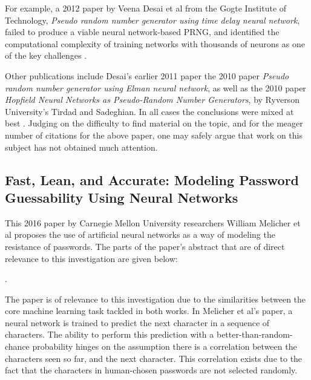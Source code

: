 \documentclass[12pt, titlepage]{report}
\theoremstyle{definition}
\begin{document}
For example, a 2012 paper by Veena Desai et al from the Gogte Institute of Technology, \textit{Pseudo random number generator using time delay neural network}, failed to produce a viable neural network-based PRNG, and identified the computational complexity of training networks with thousands of neurons as one of the key challenges \cite{desai2012pseudo}.

Other publications include Desai's earlier 2011 paper  the 2010 paper \textit{Pseudo random number generator using Elman neural network}, as well as the 2010 paper \textit{Hopfield Neural Networks as Pseudo-Random Number Generators}, by Ryverson University's Tirdad and Sadeghian. In all cases the conclusions were mixed at best \cite{desai2011pseudo} \cite{tirdad2010hopfield}. Judging on the difficulty to find material on the topic, and for the meager number of citations for the above paper, one may safely argue that work on this subject has not obtained much attention.



\subsection{Fast, Lean, and Accurate: Modeling Password Guessability Using Neural Networks}
This 2016 paper by Carnegie Mellon University researchers William Melicher et al proposes the use of artificial neural networks as a way of modeling the resistance of passwords. The parts of the paper's abstract that are of direct relevance to this investigation are given below:

 \cite{melicher2016fast}.

The paper is of relevance to this investigation due to the similarities between the core machine learning task tackled in both works. In Melicher et al's paper, a neural network is trained to predict the next character in a sequence of characters. The ability to perform this prediction with a better-than-random-chance probability hinges on the assumption there is a correlation between the characters seen so far, and the next character. This correlation exists due to the fact that the characters in human-chosen passwords are not selected randomly.
\end{document}
